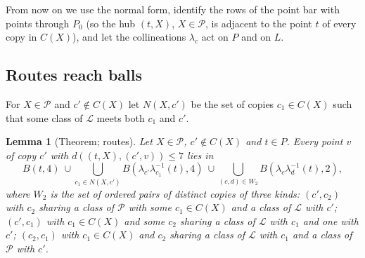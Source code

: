 \documentclass[11pt]{amsart}
\theoremstyle{plain}
\newtheorem{lemma}{Lemma}[section]
\theoremstyle{definition}
\theoremstyle{remark}
\newcommand{\cP}{\mathcal{P}}
\newcommand{\cL}{\mathcal{L}}
\newcommand{\pP}{P}  %
\newcommand{\lL}{L}  %
\begin{document}
From now on we use the normal form, identify the rows of the point bar with points through $P_0$ (so the hub $(t,X)$,
$X \in \cP$, is adjacent to the point $t$ of every copy in $C(X)$), and let the collineations $\lambda_c$ act on $\pP$
and on $\lL$.

\subsection{Routes reach balls}
For $X \in \cP$ and $c' \notin C(X)$ let $N(X,c')$ be the set of copies $c_1 \in C(X)$ such that some class of $\cL$
meets both $c_1$ and $c'$.

\begin{lemma}[Theorem; routes]\label{lem:routes}
Let $X \in \cP$, $c' \notin C(X)$ and $t \in \pP$. Every point $v$ of copy $c'$ with $d((t,X),(c',v)) \le 7$ lies in
\[
B(t,4) \ \cup \bigcup_{c_1 \in N(X,c')} B(\lambda_{c'}\lambda_{c_1}^{-1}(t), 4) \ \cup \bigcup_{(c,d) \in W_2}
B(\lambda_c\lambda_d^{-1}(t), 2),
\]
where $W_2$ is the set of ordered pairs of distinct copies of three kinds: $(c', c_2)$ with $c_2$ sharing a class of
$\cP$ with some $c_1 \in C(X)$ and a class of $\cL$ with $c'$; $(c', c_1)$ with $c_1 \in C(X)$ and some $c_2$ sharing a
class of $\cL$ with $c_1$ and one with $c'$; $(c_2, c_1)$ with $c_1 \in C(X)$ and $c_2$ sharing a class of $\cL$ with
$c_1$ and a class of $\cP$ with $c'$.
\end{lemma}
\end{document}
